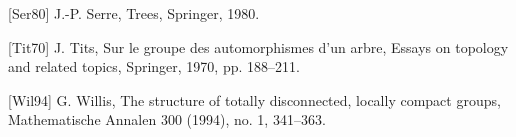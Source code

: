 \documentclass[preview]{standalone}
\begin{document}
\begin{center}
[Ser80] J.-P. Serre, Trees, Springer, 1980.

                        [Tit70] J. Tits, Sur le groupe des automorphismes d’un arbre, Essays on topology and related topics, Springer, 1970, pp. 188–211.

                        [Wil94] G. Willis, The structure of totally disconnected, locally compact groups, Mathematische Annalen 300 (1994), no. 1, 341–363.
\end{center}
\end{document}
